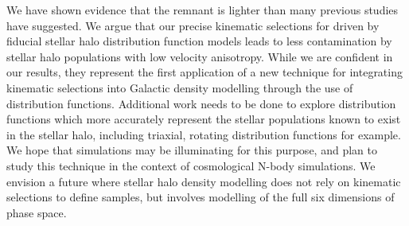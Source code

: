 We have shown evidence that the \gse remnant is lighter than many previous studies have suggested. We argue that our precise kinematic selections for \gse driven by fiducial stellar halo distribution function models leads to less contamination by stellar halo populations with low velocity anisotropy. While we are confident in our results, they represent the first application of a new technique for integrating kinematic selections into Galactic density modelling through the use of distribution functions. Additional work needs to be done to explore distribution functions which more accurately represent the stellar populations known to exist in the stellar halo, including triaxial, rotating distribution functions for example. We hope that simulations may be illuminating for this purpose, and plan to study this technique in the context of cosmological N-body simulations. We envision a future where stellar halo density modelling does not rely on kinematic selections to define samples, but involves modelling of the full six dimensions of phase space.




